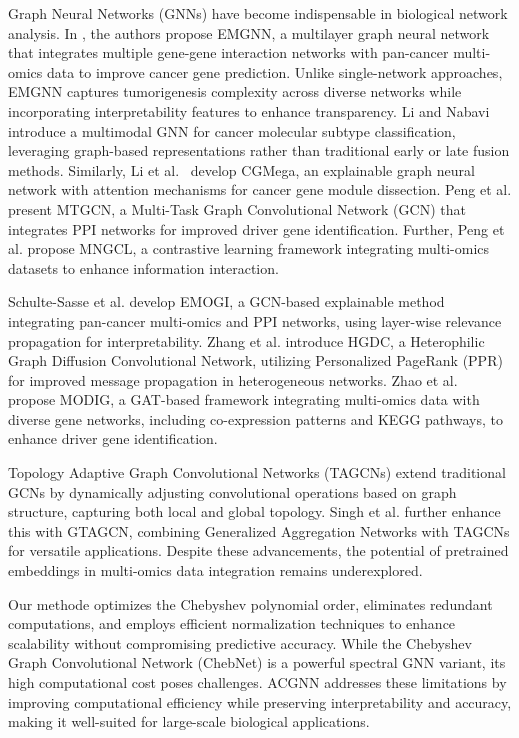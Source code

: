 Graph Neural Networks (GNNs) have become indispensable in biological network analysis. In \cite{chatzianastasis2023emgnn}, the authors propose EMGNN, a multilayer graph neural network that integrates multiple gene-gene interaction networks with pan-cancer multi-omics data to improve cancer gene prediction. Unlike single-network approaches, EMGNN captures tumorigenesis complexity across diverse networks while incorporating interpretability features to enhance transparency.
Li and Nabavi~\cite{li2024multimodalgnn} introduce a multimodal GNN for cancer molecular subtype classification, leveraging graph-based representations rather than traditional early or late fusion methods. Similarly, Li et al.~\cite{li2023cgmega} develop CGMega, an explainable graph neural network with attention mechanisms for cancer gene module dissection.
Peng et al.\cite{peng2022cancerdriver} present MTGCN, a Multi-Task Graph Convolutional Network (GCN) that integrates PPI networks for improved driver gene identification. Further, Peng et al.\cite{peng2024multinetwork} propose MNGCL, a contrastive learning framework integrating multi-omics datasets to enhance information interaction.

Schulte-Sasse et al.\cite{schulte2021multiomics} develop EMOGI, a GCN-based explainable method integrating pan-cancer multi-omics and PPI networks, using layer-wise relevance propagation for interpretability. Zhang et al.\cite{zhang2023heterophilic} introduce HGDC, a Heterophilic Graph Diffusion Convolutional Network, utilizing Personalized PageRank (PPR) for improved message propagation in heterogeneous networks.
Zhao et al.~\cite{zhao2022modig} propose MODIG, a GAT-based framework integrating multi-omics data with diverse gene networks, including co-expression patterns and KEGG pathways, to enhance driver gene identification.

Topology Adaptive Graph Convolutional Networks (TAGCNs)\cite{du2018topology} extend traditional GCNs by dynamically adjusting convolutional operations based on graph structure, capturing both local and global topology. Singh et al.\cite{singh2024gtagcn} further enhance this with GTAGCN, combining Generalized Aggregation Networks with TAGCNs for versatile applications. Despite these advancements, the potential of pretrained embeddings in multi-omics data integration remains underexplored.

Our methode optimizes the Chebyshev polynomial order, eliminates redundant computations, and employs efficient normalization techniques to enhance scalability without compromising predictive accuracy. While the Chebyshev Graph Convolutional Network (ChebNet) is a powerful spectral GNN variant, its high computational cost poses challenges. ACGNN addresses these limitations by improving computational efficiency while preserving interpretability and accuracy, making it well-suited for large-scale biological applications.
